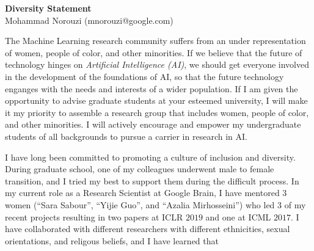 \documentclass[10pt]{article}
\begin{document}
\thispagestyle{fancy}
\lhead{}
\rhead{}
\renewcommand{\headrulewidth}{0pt} 
\renewcommand{\footrulewidth}{0pt} 


\pagestyle{fancy}
\lhead{\textcolor{gray}{\it Mohammad Norouzi}}
\rhead{\textcolor{gray}{\thepage/\totalpages{}}}


\begin{center}
{\LARGE \bf Diversity Statement}\\
\vspace*{0.1cm}
{\normalsize Mohammad Norouzi (mnorouzi@google.com)}
\vspace*{0.2cm}
\end{center}



The Machine Learning research community suffers from an under
representation of women, people of color, and other minorities. If we
believe that the future of technology hinges on {\em Artificial
  Intelligence (AI)}, we should get everyone involved in the
development of the foundations of AI, so that the future technology
enganges with the needs and interests of a wider population. If I am
given the opportunity to advise graduate students at your esteemed
university, I will make it my priority to assemble a research group
that includes women, people of color, and other minorities. I will
actively encourage and empower my undergraduate students of all
backgrounds to pursue a carrier in research in AI.

I have long been committed to promoting a culture of inclusion and
diversity. During graduate school, one of my colleagues underwent male
to female transition, and I tried my best to support them during the
difficult process. In my current role as a Research Scientist at
Google Brain, I have mentored $3$ women (``Sara Sabour'', ``Yijie
Guo'', and ``Azalia Mirhosseini'') who led $3$ of my recent projects
resulting in two papers at ICLR $2019$ and one at ICML $2017$. I have
collaborated with different researchers with different ethnicities,
sexual orientations, and religous beliefs, and I have learned that
\end{document}
